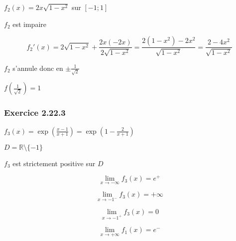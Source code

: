 \documentclass[a4paper,10pt]{report}
\begin{document}
$f_2(x) = 2x\sqrt{1-x^2}$ sur $[-1 ; 1]$

$f_2$ est impaire

\begin{displaymath}
	f_2'(x) = 2\sqrt{1-x^2} + \frac{2x(-2x)}{2\sqrt{1-x^2}} 
	        = \frac{2(1-x^2)-2x^2}{\sqrt{1-x^2}}
	        = \frac{2-4x^2}{\sqrt{1-x^2}}
\end{displaymath}

$f_2$ s'annule donc en $\pm \frac{1}{\sqrt{2}}$

$f\left( \frac{1}{\sqrt{2}} \right) = 1$
	


\subsubsection*{Exercice 2.22.3}

$f_3(x) = \exp\left( \frac{x-1}{x+1}\right) = \exp\left(1- \frac{2}{x+1}\right)$

$D = \mathbb{R} \setminus \{-1\}$

$f_3$ est strictement positive sur $D$

\begin{displaymath}
	\lim_{x \rightarrow -\infty} f_3(x) = e^{+}
\end{displaymath}

\begin{displaymath}
	\lim_{x \rightarrow -1^{-}} f_3(x) = +\infty
\end{displaymath}

\begin{displaymath}
	\lim_{x \rightarrow -1^{+}} f_3(x) = 0
\end{displaymath}

\begin{displaymath}
	\lim_{x \rightarrow +\infty} f_1(x) = e^{-}
\end{displaymath}
\end{document}
